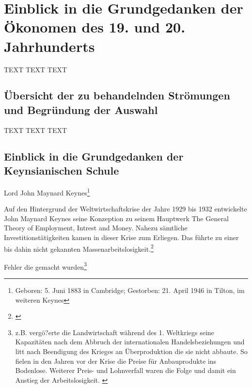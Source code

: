 \documentclass[
        onecolumn,
        a4paper,
        abstracton,
        parskip=half
        ,final
        ]{scrartcl}
\begin{document}
\clearpage





\section{Einblick in die Grundgedanken der {\"O}konomen des 19. und 20. Jahrhunderts}
  \label{sec3:stroemungen}
  TEXT TEXT TEXT


\subsection{{\"U}bersicht der zu behandelnden Str{\"o}mungen und Begr{\"u}ndung der Auswahl} %

TEXT TEXT TEXT





\subsection{Einblick in die Grundgedanken der Keynsianischen Schule} %

Lord John Maynard Keynes\footnote[14]{Geboren:  5. Juni 1883 in Cambridge; Gestorben: 21. April 1946 in Tilton, im weiteren Keynes}

Auf den Hintergrund der Weltwirtschaftskrise der Jahre 1929 bis 1932 entwickelte John Maynard Keynes seine Konzeption zu seinem Hauptwerk \frqq The General Theory of Employment, Intrest and Money\flqq. Nahezu s{\"a}mtliche Investitionst{\"a}tigkeiten kamen in dieser Krise zum Erliegen. Das f{\"u}hrte zu einer bis dahin nicht gekannten Massenarbeitslosigkeit.\footnote[601]{\citep*[S.203]{peters2000}}


 Fehler die gemacht wurden\footnote[602]{z.B.  verg{\"o}?erte die Landwirtschaft w{\"a}hrend des 1. Weltkriegs seine Kapazit{\"a}ten nach dem Abbruch der internationalen Handelsbeziehungen und litt nach Beendigung des Krieges an {\"U}berproduktion die sie nicht abbaute. So fielen in den Jahren vor der Krise die Preise f{\"u}r Anbauprodukte ins Bodenlose. Weiterer Preis- und Lohnverfall waren die Folge und damit ein Anstieg der Arbeitslosigkeit. \citep*[vgl.][S.14ff]{bombach1981theorie}}
\end{document}
